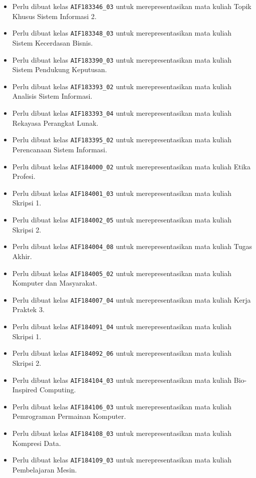 \begin{enumerate}
\begin{itemize}
		\item Perlu dibuat kelas \texttt{AIF183346\_03} untuk merepresentasikan mata kuliah Topik Khusus Sistem Informasi 2.
		\item Perlu dibuat kelas \texttt{AIF183348\_03} untuk merepresentasikan mata kuliah Sistem Kecerdasan Bisnis.
		\item Perlu dibuat kelas \texttt{AIF183390\_03} untuk merepresentasikan mata kuliah Sistem Pendukung Keputusan.
		\item Perlu dibuat kelas \texttt{AIF183393\_02} untuk merepresentasikan mata kuliah Analisis Sistem Informasi.
		\item Perlu dibuat kelas \texttt{AIF183393\_04} untuk merepresentasikan mata kuliah Rekayasa Perangkat Lunak.
		\item Perlu dibuat kelas \texttt{AIF183395\_02} untuk merepresentasikan mata kuliah Perencanaan Sistem Informasi.
		\item Perlu dibuat kelas \texttt{AIF184000\_02} untuk merepresentasikan mata kuliah Etika Profesi.
		\item Perlu dibuat kelas \texttt{AIF184001\_03} untuk merepresentasikan mata kuliah Skripsi 1.
		\item Perlu dibuat kelas \texttt{AIF184002\_05} untuk merepresentasikan mata kuliah Skripsi 2.
		\item Perlu dibuat kelas \texttt{AIF184004\_08} untuk merepresentasikan mata kuliah Tugas Akhir.
		\item Perlu dibuat kelas \texttt{AIF184005\_02} untuk merepresentasikan mata kuliah Komputer dan Masyarakat.
		\item Perlu dibuat kelas \texttt{AIF184007\_04} untuk merepresentasikan mata kuliah Kerja Praktek 3.
		\item Perlu dibuat kelas \texttt{AIF184091\_04} untuk merepresentasikan mata kuliah Skripsi 1.
		\item Perlu dibuat kelas \texttt{AIF184092\_06} untuk merepresentasikan mata kuliah Skripsi 2.
		\item Perlu dibuat kelas \texttt{AIF184104\_03} untuk merepresentasikan mata kuliah Bio-Inspired Computing.
		\item Perlu dibuat kelas \texttt{AIF184106\_03} untuk merepresentasikan mata kuliah Pemrograman Permainan Komputer.
		\item Perlu dibuat kelas \texttt{AIF184108\_03} untuk merepresentasikan mata kuliah Kompresi Data.
		\item Perlu dibuat kelas \texttt{AIF184109\_03} untuk merepresentasikan mata kuliah Pembelajaran Mesin.

\end{itemize}
\end{enumerate}
